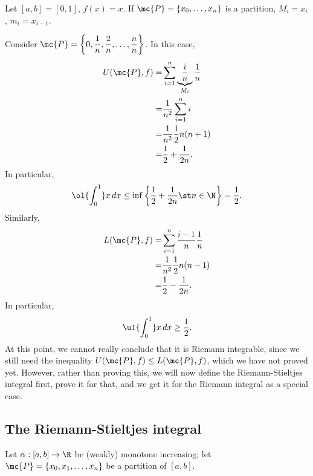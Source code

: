 \begin{example}
	Let \([a,b]=[0,1]\), \(f(x)=x\). If \(\mc{P}=\{x_0,\dots,x_n\}\) is a partition, \(M_i=x_i\), \(m_i=x_{i-1}\).
	
	\medskip
	
	Consider \(\mc{P}=\left\{0,\displaystyle\frac{1}{n},\frac{2}{n},\dots, \frac{n}{n}\right\}\). In this case, 
	\begin{align*}
		U(\mc{P},f)=&\sum_{i=1}^n\underbrace{\frac{i}{n}}_{M_i}\frac{1}{n}\\
		=&\frac{1}{n^2}\sum_{i=1}^n i\\
		=&\frac{1}{n^2}\frac{1}{2}n(n+1)\\
		=&\frac{1}{2}+\frac{1}{2n}.
	\end{align*}
	In particular, 
	\begin{equation*}
		\ol{\int_0^1}x \, dx\leq \inf\left\{\frac{1}{2}+\frac{1}{2n}\st n\in\N\right\}=\frac{1}{2}.
	\end{equation*}
	Similarly, 
	\begin{align*}
		L(\mc{P},f)=&\sum_{i=1}^n\frac{i-1}{n}\frac{1}{n}\\
				   =&\frac{1}{n^2}\frac{1}{2}n(n-1)\\
				   =&\frac{1}{2}-\frac{1}{2n}.
	\end{align*}
	In particular, 
	\begin{equation*}
		\ul{\int_0^1}x \, dx\geq \frac{1}{2}.
	\end{equation*}
	At this point, we cannot really conclude that it is Riemann integrable, since we still need the inequality \(U(\mc{P},f)\leq L(\mc{P},f)\), which we have not proved yet. However, rather than proving this, we will now define the Riemann-Stieltjes integral first, prove it for that, and we get it for the Riemann integral as a special case.
\end{example}

\subsection{The Riemann-Stieltjes integral}
Let \(\alpha:[a,b]\to\R\) be (weakly) monotone increasing; let \(\mc{P}=\{x_0,x_1,\dots,x_n\}\) be a partition of \([a,b]\). 

\medskip

